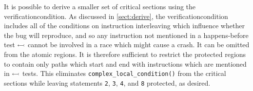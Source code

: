 
It is possible to derive a smaller set of critical sections using the
\gls{verificationcondition}.  As discussed in \autoref{sect:derive},
the \gls{verificationcondition} includes all of the conditions on
instruction interleaving which influence whether the bug will
reproduce, and so any instruction not mentioned in a happens-before
test $\leftarrowtail$ cannot be involved in a race which might
cause a crash.  It can be omitted from the atomic regions.  It is
therefore sufficient to restrict the protected regions to contain only
paths which start and end with instructions which are mentioned in
$\leftarrowtail$ tests.  This eliminates
\texttt{complex\_local\_condition()} from the critical sections
while leaving statements \texttt{2}, \texttt{3}, \texttt{4}, and
\texttt{8} protected, as desired.


